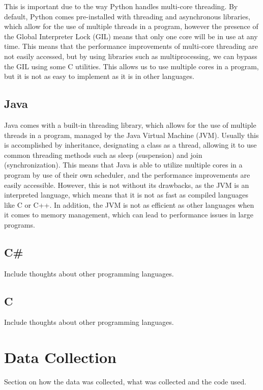 \documentclass{article}
\begin{document}
This is important due to the way Python handles multi-core threading. By default, Python comes pre-installed with threading and asynchronous libraries, which allow for the use of multiple threads in a program, however the presence of the Global Interpreter Lock (GIL) means that only one core will be in use at any time. This means that the performance improvements of multi-core threading are not easily accessed, but by using libraries such as multiprocessing, we can bypass the GIL using some C utilities. This allows us to use multiple cores in a program, but it is not as easy to implement as it is in other languages.

\subsection{Java}

Java comes with a built-in threading library, which allows for the use of multiple threads in a program, managed by the Java Virtual Machine (JVM). Usually this is accomplished by inheritance, designating a class as a thread, allowing it to use common threading methods such as sleep (suspension) and join (synchronization). This means that Java is able to utilize multiple cores in a program by use of their own scheduler, and the performance improvements are easily accessible. However, this is not without its drawbacks, as the JVM is an interpreted language, which means that it is not as fast as compiled languages like C or C++. In addition, the JVM is not as efficient as other languages when it comes to memory management, which can lead to performance issues in large programs. 

\subsection{C\#}

Include thoughts about other programming languages.

\subsection{C}

Include thoughts about other programming languages.

\section{Data Collection}

Section on how the data was collected, what was collected and the code used. 
\end{document}

